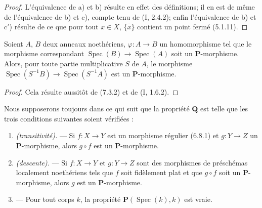 \begin{proof}
L'équivalence de a) et b) résulte en effet des définitions; il en est de
même de l'équivalence de b) et c), compte tenu de (I, 2.4.2); enfin
l'équivalence de b) et c$'$) résulte de ce que pour tout $x\in X$,
$\overline{\{x\}}$ contient un point fermé (5.1.11).
\end{proof}

\begin{corollary}[7.3.3]
\label{IV.2.s7.3.3-fr}
Soient $A$, $B$ deux anneaux noethériens, $\varphi:A\to B$ un homomorphisme
tel que le morphisme correspondant
$\operatorname{Spec}(B)\to\operatorname{Spec}(A)$ soit un
$\boldsymbol P$-morphisme. Alors, pour toute partie multiplicative $S$ de
$A$, le morphisme
$\operatorname{Spec}(S^{-1}B)\to\operatorname{Spec}(S^{-1}A)$ est un
$\boldsymbol P$-morphisme.
\end{corollary}

\begin{proof}
Cela résulte aussitôt de (7.3.2) et de (I, 1.6.2).
\end{proof}

\begin{env}[7.3.4]
\label{IV.2.s7.3.4-fr}
Nous supposerons toujours dans ce qui suit que la propriété
$\boldsymbol Q$ est telle que les trois conditions suivantes soient
vérifiées :
\begin{enumerate}
\item[$(\mathrm P_{\mathrm I})$] \emph{(transitivité).} --- Si
$f:X\to Y$ est un morphisme régulier (6.8.1) et $g:Y\to Z$ un
$\boldsymbol P$-morphisme, alors $g\circ f$ est un
$\boldsymbol P$-morphisme.
\item[$(\mathrm P_{\mathrm{II}})$] \emph{(descente).} --- Si
$f:X\to Y$ et $g:Y\to Z$ sont des morphismes de préschémas localement
noethériens tels que $f$ soit fidèlement plat et que $g\circ f$ soit un
$\boldsymbol P$-morphisme, alors $g$ est un $\boldsymbol P$-morphisme.
\item[$(\mathrm P_{\mathrm{III}})$] --- Pour tout corps $k$, la propriété
$\boldsymbol P(\operatorname{Spec}(k),k)$ est vraie.
\end{enumerate}
\end{env}

